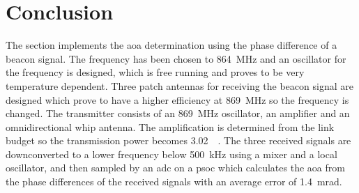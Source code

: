 


%

%

%

%


\section{Conclusion}
The section implements the \gls{aoa} determination using the phase difference of a beacon signal. The frequency has been chosen to \SI{864}{\mega\hertz} and an oscillator for the frequency is designed, which is free running and proves to be very temperature dependent. Three patch antennas for receiving the beacon signal are designed which prove to have a higher efficiency at \SI{869}{\mega\hertz} so the frequency is changed. The transmitter consists of an \SI{869}{\mega\hertz} oscillator, an amplifier and an omnidirectional whip antenna. The amplification is determined from the link budget so the transmission power becomes \SI{3.02}{\deci\belm}. The three received signals are downconverted to a lower frequency below \SI{500}{\kilo\hertz} using a mixer and a local oscillator, and then sampled by an \gls{adc} on a \gls{psoc} which calculates the \gls{aoa} from the phase differences of the received signals with an average error of \SI{1.4}{\milli\radian}.